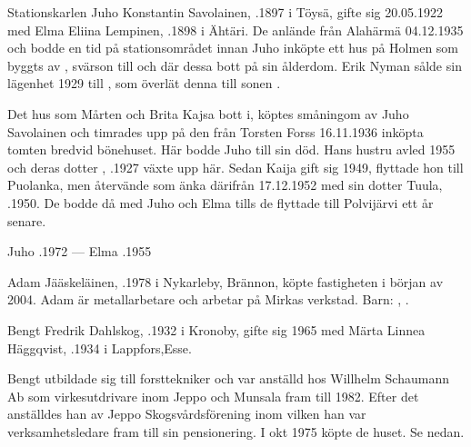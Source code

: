 %
Stationskarlen Juho Konstantin Savolainen, .1897 i Töysä, gifte sig 20.05.1922 med Elma Eliina Lempinen, .1898 i Ähtäri. De anlände från Alahärmä 04.12.1935 och bodde en tid på stationsområdet innan Juho inköpte ett hus på Holmen som byggts av , svärson till  och där dessa bott på sin ålderdom. Erik Nyman sålde sin lägenhet 1929 till , som överlät denna till sonen .

Det hus som Mårten och Brita Kajsa bott i, köptes småningom av Juho Savolainen och timrades upp på den från Torsten Forss 16.11.1936 inköpta tomten bredvid bönehuset. Här bodde Juho till sin död. Hans hustru avled 1955 och deras dotter , .1927 växte upp här. Sedan Kaija gift sig 1949, flyttade hon till Puolanka, men återvände som änka därifrån 17.12.1952 med sin dotter Tuula, .1950. De bodde då med Juho och Elma tills de flyttade till Polvijärvi ett år senare.

Juho .1972  ---  Elma .1955



%


%
Adam Jääskeläinen, .1978 i Nykarleby, Brännon, köpte fastigheten i början av 2004. Adam är metallarbetare och arbetar på Mirkas verkstad.
Barn: , .\jhvspace{}


%
Bengt Fredrik Dahlskog, .1932 i Kronoby, gifte sig 1965 med Märta Linnea Häggqvist, .1934 i Lappfors,Esse.

Bengt utbildade sig till forsttekniker och var anställd hos Willhelm Schaumann Ab som virkesutdrivare inom Jeppo och Munsala fram till 1982. Efter det anställdes han av Jeppo Skogsvårdsförening inom vilken han var verksamhetsledare fram till sin pensionering. I okt 1975 köpte de huset. Se nedan.


